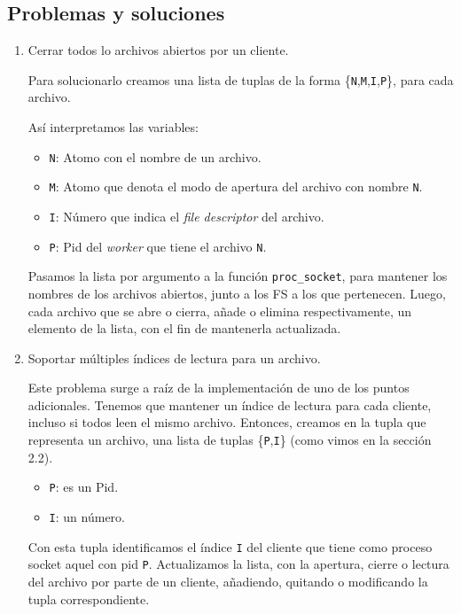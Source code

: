 \documentclass[a4paper, 8pt]{article}
\begin{document}
\subsection{Problemas y soluciones}

\begin{enumerate}
%   
%   
  \item Cerrar todos lo archivos abiertos por un cliente.
  
  Para solucionarlo creamos una lista de tuplas de la forma \{\texttt{N},\texttt{M},\texttt{I},\texttt{P}\}, para cada archivo.
  
  Así interpretamos las variables:
  
  \begin{itemize}
    \item \texttt{N}: Atomo con el nombre de un archivo.
    \item \texttt{M}: Atomo que denota el modo de apertura del archivo con nombre \texttt{N}.
    \item \texttt{I}: Número que indica el \textit{file descriptor} del archivo.
    \item \texttt{P}: Pid del \textit{worker} que tiene el archivo \texttt{N}.
  \end{itemize}
  
  Pasamos la lista por argumento a la función \texttt{proc\_socket}, para mantener los
  nombres de los archivos abiertos, junto a los FS a los que pertenecen.
  Luego, cada archivo que se abre o cierra, añade o elimina respectivamente, un elemento de la lista, con el fin de mantenerla actualizada.
  
  \item Soportar múltiples índices de lectura para un archivo.
  
  Este problema surge a raíz de la implementación de uno de los puntos adicionales. Tenemos que mantener un índice de lectura para cada cliente,
  incluso si todos leen el mismo archivo.
  Entonces, creamos en la tupla que representa un archivo, una lista de tuplas \{\texttt{P},\texttt{I}\} (como vimos en la sección 2.2).
  
  \begin{itemize}
    \item \texttt{P}: es un Pid.
    \item \texttt{I}: un número.
  \end{itemize}
  
  Con esta tupla identificamos el índice \texttt{I} del cliente que tiene como proceso socket aquel con pid \texttt{P}.
  Actualizamos la lista, con la apertura, cierre o lectura del archivo por parte de un cliente, añadiendo, quitando o modificando la tupla correspondiente.
\end{enumerate}
\end{document}
